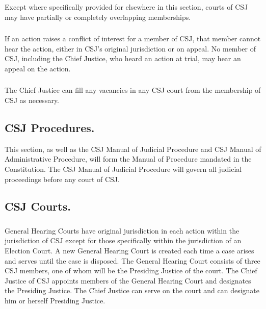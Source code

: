 \subsubsection{}
Except where specifically provided for elsewhere in this section, courts of CSJ may have partially or completely overlapping memberships.
\subsubsection{}
If an action raises a conflict of interest for a member of CSJ, that member cannot hear the action, either in CSJ's original jurisdiction or on appeal.  No member of CSJ, including the Chief Justice, who heard an action at trial, may hear an appeal on the action.
\subsubsection{}
The Chief Justice can fill any vacancies in any CSJ court from the membership of CSJ as necessary.

\subsection{CSJ Procedures.}
This section, as well as the CSJ Manual of Judicial Procedure and CSJ Manual of Administrative Procedure, will form the Manual of Procedure mandated in the Constitution.  The CSJ Manual of Judicial Procedure will govern all judicial proceedings before any court of CSJ.

\subsection{CSJ Courts.}
\subsubsection{}
General Hearing Courts have original jurisdiction in each action within the jurisdiction of CSJ except for those specifically within the jurisdiction of an Election Court.  A new General Hearing Court is created each time a case arises and serves until the case is disposed.  The General Hearing Court consists of three CSJ members, one of whom will be the Presiding Justice of the court.  The Chief Justice of CSJ appoints members of the General Hearing Court and designates the Presiding Justice.  The Chief Justice can serve on the court and can designate him or herself Presiding Justice.
